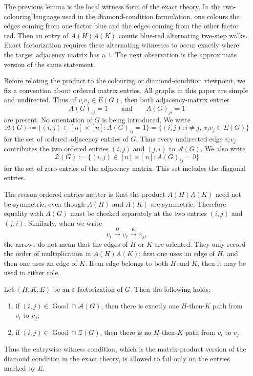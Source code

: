 \documentclass{file}
\newcommand{\eps}{\varepsilon}
\newcommand{\Good}{\operatorname{Good}}
\begin{document}
The previous lemma is the local witness form of the exact theory.  In the
two-colouring language used in the diamond-condition formulation, one colours
the edges coming from one factor blue and the edges coming from the other
factor red.  Then an entry of $A(H)A(K)$ counts blue-red alternating two-step
walks.  Exact factorization requires these alternating witnesses to occur
exactly where the target adjacency matrix has a $1$.  The next observation is the approximate version of the same statement.

Before relating the product to the colouring or diamond-condition viewpoint, we
fix a convention about ordered matrix entries.  All graphs in this paper are
simple and undirected.  Thus, if $v_iv_j\in E(G)$, then both adjacency-matrix
entries
\[
  A(G)_{ij}=1
  \qquad\text{and}\qquad
  A(G)_{ji}=1
\]
are present.  
No orientation of $G$ is being introduced.
We write
\[
  \mathcal A(G)\coloneqq \{(i,j)\in[n]\times[n]: A(G)_{ij}=1\}
  =
  \{(i,j): i\neq j,\ v_iv_j\in E(G)\}
\]
for the set of ordered adjacency entries of $G$.  Thus every undirected edge
$v_iv_j$ contributes the two ordered entries $(i,j)$ and $(j,i)$ to
$\mathcal A(G)$.  We also write
\[
  \mathcal Z(G):=\{(i,j)\in[n]\times[n]: A(G)_{ij}=0\}
\]
for the set of zero entries of the adjacency matrix.  
This set includes the diagonal entries.

The reason ordered entries matter is that the product $A(H)A(K)$ need not be
symmetric, even though $A(H)$ and $A(K)$ are symmetric.  
Therefore equality with $A(G)$ must be checked separately at the two entries $(i,j)$ and $(j,i)$.
Similarly, when we write
\[
  v_i \xrightarrow{H} v_\ell \xrightarrow{K} v_j,
\]
the arrows do not mean that the edges of $H$ or $K$ are oriented.  They only
record the order of multiplication in $A(H)A(K)$: first one uses an edge of
$H$, and then one uses an edge of $K$.  If an edge belongs to both $H$ and $K$,
then it may be used in either role.

\begin{lem}
\label{lem:approx-diamond}
Let $(H,K,E)$ be an $\eps$-factorization of $G$.
Then the following holds:
\begin{enumerate}
  \item if $(i,j)\in \Good\cap\mathcal A(G)$, then there is exactly one
  $H$-then-$K$ path from $v_i$ to $v_j$;
  \item if $(i,j)\in \Good\cap\mathcal Z(G)$, then there is no $H$-then-$K$ path from $v_i$ to $v_j$.
\end{enumerate}
Thus the entrywise witness condition, which is the matrix-product version of
the diamond condition in the exact theory, is allowed to fail only on the
entries marked by $E$.
\end{lem}
\end{document}
